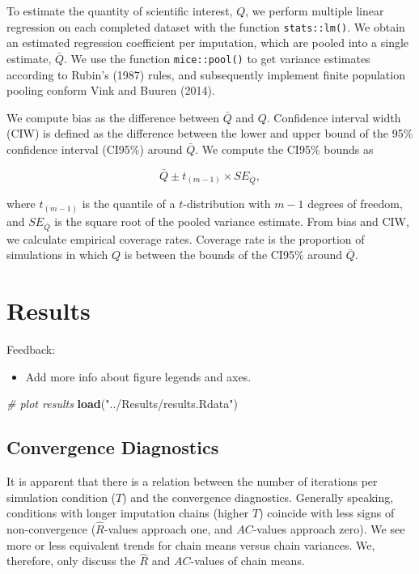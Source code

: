 \documentclass[
  Royal, times, sageapa]{sagej}
\newenvironment{Shaded}{\begin{snugshade}}{\end{snugshade}}
\newcommand{\CommentTok}[1]{\textcolor[rgb]{0.56,0.35,0.01}{\textit{#1}}}
\newcommand{\KeywordTok}[1]{\textcolor[rgb]{0.13,0.29,0.53}{\textbf{#1}}}
\newcommand{\NormalTok}[1]{#1}
\newcommand{\StringTok}[1]{\textcolor[rgb]{0.31,0.60,0.02}{#1}}
\providecommand{\tightlist}{%
  \setlength{\itemsep}{0pt}\setlength{\parskip}{0pt}}
\begin{document}
To estimate the quantity of scientific interest, \(Q\), we perform
multiple linear regression on each completed dataset with the function
\texttt{stats::lm()}. We obtain an estimated regression coefficient per
imputation, which are pooled into a single estimate, \(\bar{Q}\). We use
the function \texttt{mice::pool()} to get variance estimates according
to Rubin's (1987) rules, and subsequently implement finite population
pooling conform Vink and Buuren (2014).

We compute bias as the difference between \(\bar{Q}\) and \(Q\).
Confidence interval width (CIW) is defined as the difference between the
lower and upper bound of the 95\% confidence interval (CI95\%) around
\(\bar{Q}\). We compute the CI95\% bounds as

\[\bar{Q} \pm t_{(m-1)} \times SE_{\bar{Q}},\]

where \(t_{(m-1)}\) is the quantile of a \(t\)-distribution with \(m-1\)
degrees of freedom, and \(SE_{\bar{Q}}\) is the square root of the
pooled variance estimate. From bias and CIW, we calculate empirical
coverage rates. Coverage rate is the proportion of simulations in which
\(Q\) is between the bounds of the CI95\% around \(\bar{Q}\).

\hypertarget{results}{%
\section{Results}\label{results}}

Feedback:

\begin{itemize}
\tightlist
\item
  Add more info about figure legends and axes.
\end{itemize}

\begin{Shaded}
\begin{Highlighting}[]
\CommentTok{# plot results}
\KeywordTok{load}\NormalTok{(}\StringTok{"../Results/results.Rdata"}\NormalTok{)}
\end{Highlighting}
\end{Shaded}

\hypertarget{convergence-diagnostics-1}{%
\subsection{Convergence Diagnostics}\label{convergence-diagnostics-1}}

It is apparent that there is a relation between the number of iterations
per simulation condition (\(T\)) and the convergence diagnostics.
Generally speaking, conditions with longer imputation chains (higher
\(T\)) coincide with less signs of non-convergence
(\(\widehat{R}\)-values approach one, and \(AC\)-values approach zero).
We see more or less equivalent trends for chain means versus chain
variances. We, therefore, only discuss the \(\widehat{R}\) and
\(AC\)-values of chain means.
\end{document}
